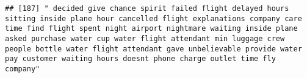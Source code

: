 \documentclass[
]{article}
\begin{document}
\begin{verbatim}
## [187] " decided give chance spirit failed flight delayed hours sitting inside plane hour cancelled flight explanations company care time find flight spent night airport nightmare waiting inside plane asked purchase water cup water flight attendant min luggage crew people bottle water flight attendant gave unbelievable provide water pay customer waiting hours doesnt phone charge outlet time fly company"                                                                                                                                                                                                                                                                                                                                                                                                                                                                                                                                                                                                                                                                                                                                                                                                                                                                                                                                                                                                                                                                                                                                                                                                                                                                                                                                                                                 

\end{verbatim}
\end{document}
